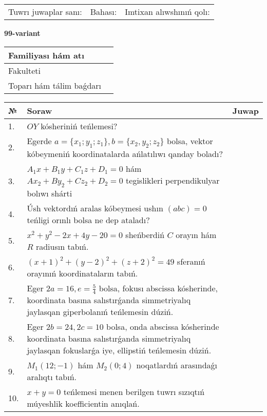 \documentclass{article}
\begin{document}
\vspace{1cm}

\begin{tabular}{lll}
Tuwrı juwaplar sanı: \underline{\hspace{1.5cm}} & 
Bahası: \underline{\hspace{1.5cm}} & 
Imtixan alıwshınıń qolı: \underline{\hspace{2cm}} \\
\end{tabular}

\egroup

\newpage


\textbf{99-variant}\\

\bgroup
\def\arraystretch{1.6} %

\begin{tabular}{|m{5.7cm}|m{9.5cm}|}
\hline
Familiyası hám atı & \\
\hline
Fakulteti  & \\
\hline
Toparı hám tálim baǵdarı  & \\
\hline
\end{tabular}

\vspace{1cm}

\begin{tabular}{|m{0.7cm}|m{10cm}|m{4cm}|}
\hline
№ & Soraw & Juwap \\
\hline
1. & $OY$ kósheriniń teńlemesi? &  \\
\hline
2. & Egerde $a=\{ x_1; y_1; z_1\}, b=\{ x_2, y_2; z_2\}$ bolsa, vektor kóbeymeniń koordinatalarda ańlatılıwı qanday boladı? &  \\
\hline
3. & $A_1x+B_1y+C_1z+D_1=0$ hám $Ax_2+By_2+Cz_2+D_2=0$ tegislikleri perpendikulyar bolıwı shárti &  \\
\hline
4. & Úsh vektordıń aralas kóbeymesi ushın $(abc)=0$ teńligi orınlı bolsa ne dep ataladı? &  \\
\hline
5. & $x^{2}+y^{2}-2x+4y-20=0$ sheńberdiń $C$ orayın hám $R$ radiusın tabıń. &  \\
\hline
6. & $(x+1)^{2}+(y-2) ^{2}+(z+2) ^{2}=49$ sferanıń orayınıń koordinataların tabıń. &  \\
\hline
7. & Eger $2a=16, e=\frac{5}{4}$ bolsa, fokusı abscissa kósherinde, koordinata basına salıstırǵanda simmetriyalıq jaylasqan giperbolanıń teńlemesin dúziń. &  \\
\hline
8. & Eger $2b=24, 2 c=10$ bolsa, onda abscissa kósherinde koordinata basına salıstırǵanda simmetriyalıq jaylasqan fokuslarǵa iye, ellipstiń teńlemesin dúziń. &  \\
\hline
9. & $M_{1} (12;-1)$ hám $M_{2} (0;4)$ noqatlardıń arasındaǵı aralıqtı tabıń. &  \\
\hline
10. & $x+y=0$ teńlemesi menen berilgen tuwrı sızıqtıń múyeshlik koefficientin anıqlań. &  \\
\hline
\end{tabular}
\end{document}
